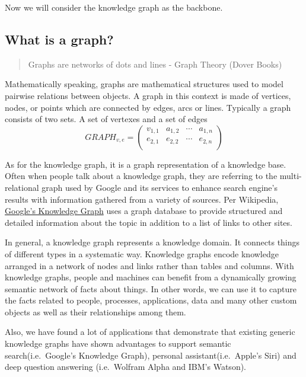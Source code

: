 \documentclass{acm_proc_article-sp}
\begin{document}
Now we will consider the knowledge graph as the backbone.

\subsection{What is a graph?}\label{what-is-a-graph}

\begin{quote}
Graphs are networks of dots and lines - Graph Theory (Dover Books)
\end{quote}

Mathematically speaking, graphs are mathematical structures used to
model pairwise relations between objects. A graph in this context is
made of vertices, nodes, or points which are connected by edges, arcs or
lines. Typically a graph consists of two sets. A set of vertexes and a
set of edges \[GRAPH_{v,e} =
 \begin{pmatrix}
  v_{1,1} & a_{1,2} & \cdots & a_{1,n} \\
  e_{2,1} & e_{2,2} & \cdots & e_{2,n} \\
 \end{pmatrix}\]

As for the knowledge graph, it is a graph representation of a knowledge
base. Often when people talk about a knowledge graph, they are referring
to the multi-relational graph used by Google and its services to enhance
search engine's results with information gathered from a variety of
sources. Per Wikipedia,
\href{https://developers.google.com/knowledge-graph/\#knowledge_graph_entities}{Google's
Knowledge Graph} uses a graph database to provide structured and
detailed information about the topic in addition to a list of links to
other sites.

In general, a knowledge graph represents a knowledge domain. It connects
things of different types in a systematic way. Knowledge graphs encode
knowledge arranged in a network of nodes and links rather than tables
and columns. With knowledge graphs, people and machines can benefit from
a dynamically growing semantic network of facts about things. In other
words, we can use it to capture the facts related to people, processes,
applications, data and many other custom objects as well as their
relationships among them.

Also, we have found a lot of applications that demonstrate that existing
generic knowledge graphs have shown advantages to support semantic
search(i.e.~Google's Knowledge Graph), personal assistant(i.e.~Apple's
Siri) and deep question answering (i.e.~Wolfram Alpha and IBM's Watson).
\end{document}

